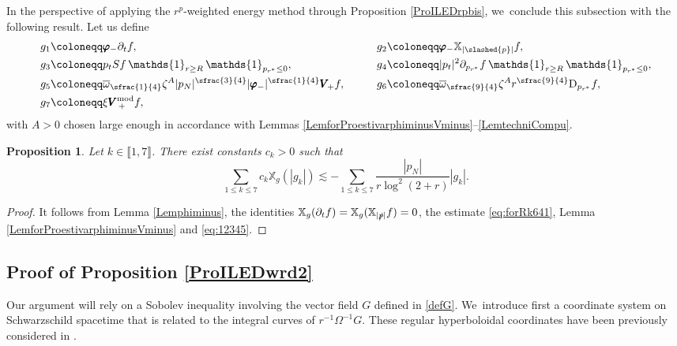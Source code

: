 \documentclass[JEP,XML,SOM,Unicode,published]{cedram}
\theoremstyle{plain}
\newtheorem{proposition}{Proposition}[section]
\theoremstyle{definition}
\newcommand\z{{\zeta}}
\newcommand\T{{\mathbb{X}}}
\begin{document}
In the perspective of applying the $r^p$-weighted energy method through Proposition \ref{ProILEDrpbis}, we~conclude this subsection with the following result. Let us define
\begin{alignat*}{2}
&g_1 \coloneqq \pmb{\varphi}_- \partial_t f, \qquad
&&g_2 \coloneqq \pmb{\varphi}_- \T_{|\slashed{p}|} f, \\
&g_3 \coloneqq p_t Sf \, \mathds{1}_{r \geq R} \, \mathds{1}_{p_{r^*} \leq 0}, \qquad
&& g_4 \coloneqq |p_t|^2 \partial_{p_{r^*}} f \, \mathds{1}_{r \geq R} \, \mathds{1}_{p_{r^*} \leq 0}, \\
&g_5 \coloneqq \overline{\omega}_{\sfrac{1}{4}} \z^A |p_N|^{\sfrac{3}{4}} |\pmb{\varphi}_-|^{\sfrac{1}{4}} \pmb{V}_{\! +} f, \qquad && g_6 \coloneqq \overline{\omega}_{\sfrac{9}{4}} \z^A r^{\sfrac{9}{4}} \mathrm{D}_{p_{r^*}} f, \\
&g_7 \coloneqq \xi \pmb{V}_{\, +}^{ \mathrm{mod}} f,
\end{alignat*}
with $A>0$ chosen large enough in accordance with Lemmas \ref{LemforProestivarphiminusVminus}--\ref{LemtechniCompu}.

\begin{proposition}\label{Rksystemderiv}
Let $k\in \llbracket 1, 7 \rrbracket$. There exist constants $c_k>0$ such that
\begin{equation}
\sum_{1 \leq k \leq 7} c_k \T_g (|g_k|) \lesssim -\sum_{1 \leq k \leq 7} \frac{|p_N|}{r\log^2(2+r)} |g_k|.
\end{equation}
\end{proposition}

\begin{proof}
It follows from Lemma \ref{Lemphiminus}, the identities $\T_g(\partial_t f)=\T_g(\T_{|\slashed{p}|}f)=0$, the estimate \eqref{eq:forRk641}, Lemma \ref{LemforProestivarphiminusVminus} and \eqref{eq:12345}.
\end{proof}

\subsection{Proof of Proposition \ref{ProILEDwrd2}}\label{Subsec75}

Our argument will rely on a Sobolev inequality involving the vector field $G$ defined in \eqref{defG}. We~introduce first a coordinate system on Schwarzschild spacetime that is related to the integral curves of $r^{-1} \Omega^{-1}G$. These regular hyperboloidal coordinates have been previously considered in \cite{Mavr23}.
\end{document}
